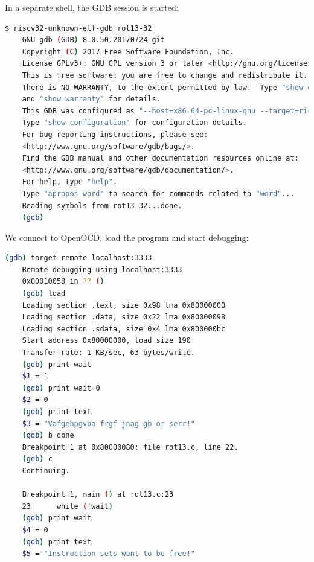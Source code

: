 \documentclass{article}
\begin{document}
    \newpage
    In a separate shell, the GDB session is started:
    
    \begin{lstlisting}[language=bash]
	$ riscv32-unknown-elf-gdb rot13-32
	GNU gdb (GDB) 8.0.50.20170724-git
	Copyright (C) 2017 Free Software Foundation, Inc.
	License GPLv3+: GNU GPL version 3 or later <http://gnu.org/licenses/gpl.html>
	This is free software: you are free to change and redistribute it.
	There is NO WARRANTY, to the extent permitted by law.  Type "show copying"
	and "show warranty" for details.
	This GDB was configured as "--host=x86_64-pc-linux-gnu --target=riscv32-unknown-elf".
	Type "show configuration" for configuration details.
	For bug reporting instructions, please see:
	<http://www.gnu.org/software/gdb/bugs/>.
	Find the GDB manual and other documentation resources online at:
	<http://www.gnu.org/software/gdb/documentation/>.
	For help, type "help".
	Type "apropos word" to search for commands related to "word"...
	Reading symbols from rot13-32...done.
	(gdb) 
    \end{lstlisting}
    
    We connect to OpenOCD, load the program and start debugging:
    
    \begin{lstlisting}[language=bash]
	(gdb) target remote localhost:3333
	Remote debugging using localhost:3333
	0x00010058 in ?? ()
	(gdb) load
	Loading section .text, size 0x98 lma 0x80000000
	Loading section .data, size 0x22 lma 0x80000098
	Loading section .sdata, size 0x4 lma 0x800000bc
	Start address 0x80000000, load size 190
	Transfer rate: 1 KB/sec, 63 bytes/write.
	(gdb) print wait
	$1 = 1
	(gdb) print wait=0
	$2 = 0
	(gdb) print text
	$3 = "Vafgehpgvba frgf jnag gb or serr!"
	(gdb) b done
	Breakpoint 1 at 0x80000080: file rot13.c, line 22.
	(gdb) c
	Continuing.
	
	Breakpoint 1, main () at rot13.c:23
	23	    while (!wait)
	(gdb) print wait
	$4 = 0
	(gdb) print text
	$5 = "Instruction sets want to be free!"

    \end{lstlisting}
	
\end{document}
